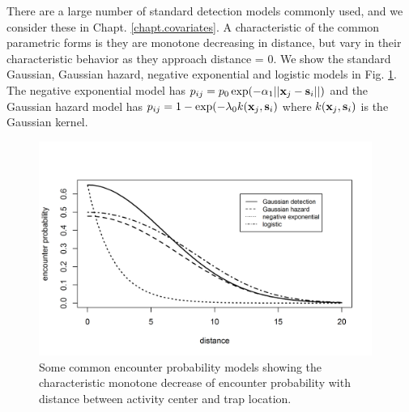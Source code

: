 There are a large number of standard detection
models commonly used, and we consider these in
Chapt. \ref{chapt.covariates}.
A characteristic of the common parametric forms is they are monotone
decreasing in distance, but vary in their characteristic behavior as
they approach distance = 0.
We show the standard Gaussian, Gaussian hazard, negative exponential
and logistic models in Fig. \ref{scr0.fig.detfuncs}.
The negative exponential model has
$p_{ij} = p_{0}\exp(-\alpha_{1} ||{\bf x}_{j}-{\bf s}_{i}||)$
and the Gaussian hazard model has
$p_{ij} = 1-\exp(-\lambda_{0} k({\bf x}_{j}, {\bf s}_{i})$
where $k({\bf x}_{j}, {\bf s}_{i})$ is the Gaussian kernel.
\begin{figure}[ht] %
\begin{center}
\includegraphics[height=2.75in]{Ch4-SCR0/figs/det_functions}
\end{center}
\caption{Some common encounter probability models showing the
  characteristic monotone decrease of encounter probability with
  distance between activity center and trap location.
}
\label{scr0.fig.detfuncs}
\end{figure}
